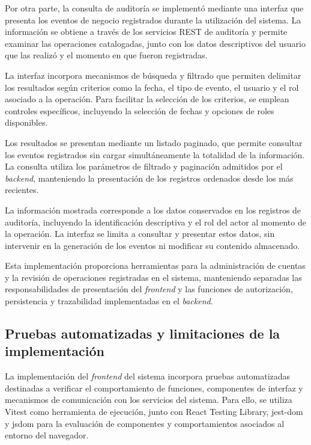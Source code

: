 Por otra parte, la consulta de auditoría
se implementó mediante una interfaz
que presenta los eventos de negocio
registrados durante la utilización
del sistema. La información se obtiene
a través de los servicios REST de
auditoría y permite examinar las
operaciones catalogadas, junto con
los datos descriptivos del usuario
que las realizó y el momento en
que fueron registradas.

La interfaz incorpora mecanismos de
búsqueda y filtrado que permiten
delimitar los resultados según
criterios como la fecha, el tipo
de evento, el usuario y el rol
asociado a la operación. Para
facilitar la selección de los
criterios, se emplean controles
específicos, incluyendo la
selección de fechas y opciones
de roles disponibles.

Los resultados se presentan mediante
un listado paginado, que permite
consultar los eventos registrados
sin cargar simultáneamente la
totalidad de la información.
La consulta utiliza los parámetros
de filtrado y paginación admitidos
por el \textit{backend}, manteniendo
la presentación de los registros
ordenados desde los más recientes.

La información mostrada corresponde
a los datos conservados en los
registros de auditoría, incluyendo
la identificación descriptiva
y el rol del actor al momento
de la operación. La interfaz
se limita a consultar y presentar
estos datos, sin intervenir
en la generación de los eventos
ni modificar su contenido
almacenado.

Esta implementación proporciona
herramientas para la administración
de cuentas y la revisión de
operaciones registradas en el sistema,
manteniendo separadas las
responsabilidades de presentación
del \textit{frontend} y las funciones
de autorización, persistencia
y trazabilidad implementadas
en el \textit{backend}.


\subsection{Pruebas automatizadas y limitaciones de la implementación}

La implementación del \textit{frontend} del sistema
incorpora pruebas automatizadas destinadas
a verificar el comportamiento de funciones,
componentes de interfaz y mecanismos de
comunicación con los servicios del sistema.
Para ello, se utiliza Vitest como herramienta
de ejecución, junto con React Testing Library,
jest-dom y jsdom para la evaluación de
componentes y comportamientos asociados
al entorno del navegador.

